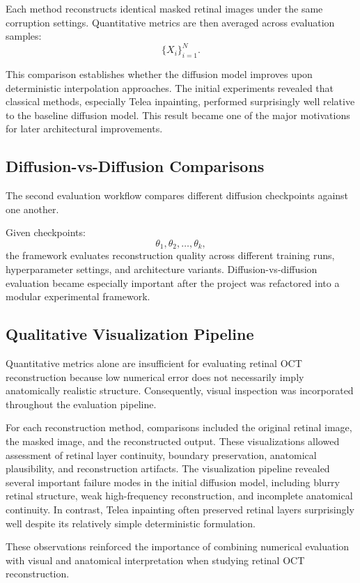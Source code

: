 \documentclass[12pt,oneside]{article}
\begin{document}
Each method reconstructs identical masked retinal images under the same corruption settings. Quantitative metrics are then averaged across evaluation samples:
\[
\{
X_i
\}_{i=1}^N.
\]

This comparison establishes whether the diffusion model improves upon deterministic interpolation approaches.
The initial experiments revealed that classical methods, especially Telea inpainting, performed surprisingly well relative to the baseline diffusion model. This result became one of the major motivations for later architectural improvements.

\subsection*{Diffusion-vs-Diffusion Comparisons}

The second evaluation workflow compares different diffusion checkpoints against one another.

Given checkpoints:
\[
\theta_1,\theta_2,\ldots,\theta_k,
\]
the framework evaluates reconstruction quality across different training runs, hyperparameter settings, and architecture variants.
Diffusion-vs-diffusion evaluation became especially important after the project was refactored into a modular experimental framework.

\subsection*{Qualitative Visualization Pipeline}

Quantitative metrics alone are insufficient for evaluating retinal OCT reconstruction because low numerical error does not necessarily imply anatomically realistic structure. Consequently, visual inspection was incorporated throughout the evaluation pipeline.

For each reconstruction method, comparisons included the original retinal image, the masked image, and the reconstructed output. These visualizations allowed assessment of retinal layer continuity, boundary preservation, anatomical plausibility, and reconstruction artifacts.
The visualization pipeline revealed several important failure modes in the initial diffusion model, including blurry retinal structure, weak high-frequency reconstruction, and incomplete anatomical continuity. In contrast, Telea inpainting often preserved retinal layers surprisingly well despite its relatively simple deterministic formulation.

These observations reinforced the importance of combining numerical evaluation with visual and anatomical interpretation when studying retinal OCT reconstruction.
\end{document}
